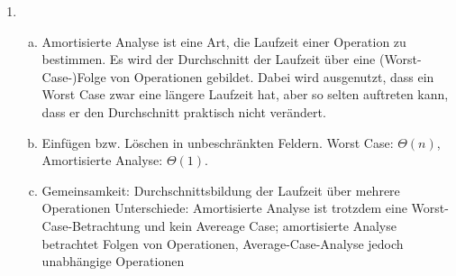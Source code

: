 \documentclass{scrartcl}
\begin{document}
\begin{enumerate}[(1)]
\item \begin{enumerate}[(a)]
\item Amortisierte Analyse ist eine Art, die Laufzeit einer Operation zu bestimmen. Es wird der Durchschnitt der Laufzeit über eine (Worst-Case-)Folge von Operationen gebildet. Dabei wird ausgenutzt, dass ein Worst Case zwar eine längere Laufzeit hat, aber so selten auftreten kann, dass er den Durchschnitt praktisch nicht verändert.
\item Einfügen bzw. Löschen in unbeschränkten Feldern. Worst Case: $\Theta(n)$, Amortisierte Analyse: $\Theta(1)$.
\item Gemeinsamkeit: Durchschnittsbildung der Laufzeit über mehrere Operationen\newline
Unterschiede: Amortisierte Analyse ist trotzdem eine Worst-Case-Betrachtung und kein Avereage Case; amortisierte Analyse betrachtet Folgen von Operationen, Average-Case-Analyse jedoch unabhängige Operationen
\end{enumerate}
\end{enumerate}
\end{document}
